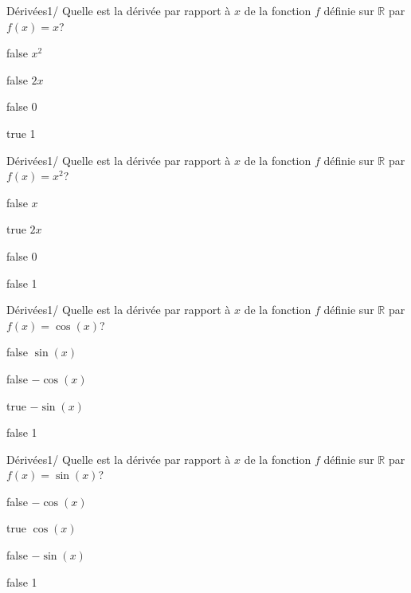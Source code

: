         	\begin{question}{22}{Dérivées}{1}{/}
				Quelle est la dérivée par rapport à $x$ de la fonction $f$ définie sur $\mathbb{R}$ par $f(x)=x$?
            \end{question}
            \begin{reponses}
            	\item[false] $x^2$
            	\item[false] $2x$
                \item[false] 0
                \item[true] 1
            \end{reponses}
        	\begin{question}{22}{Dérivées}{1}{/}
				Quelle est la dérivée par rapport à $x$ de la fonction $f$ définie sur $\mathbb{R}$ par $f(x)=x^2$?
            \end{question}
            \begin{reponses}
            	\item[false] $x$
            	\item[true] $2x$
                \item[false] 0
                \item[false] 1
            \end{reponses}
        	\begin{question}{22}{Dérivées}{1}{/}
				Quelle est la dérivée par rapport à $x$ de la fonction $f$ définie sur $\mathbb{R}$ par $f(x)=\cos(x)$?
            \end{question}
            \begin{reponses}
            	\item[false] $\sin(x)$
            	\item[false] $-\cos(x)$
                \item[true] $-\sin(x)$
                \item[false] 1
            \end{reponses}
        	\begin{question}{22}{Dérivées}{1}{/}
				Quelle est la dérivée par rapport à $x$ de la fonction $f$ définie sur $\mathbb{R}$ par $f(x)=\sin(x)$?
            \end{question}
            \begin{reponses}
            	\item[false] $-\cos(x)$
            	\item[true] $\cos(x)$
                \item[false] $-\sin(x)$
                \item[false] 1
            \end{reponses}
